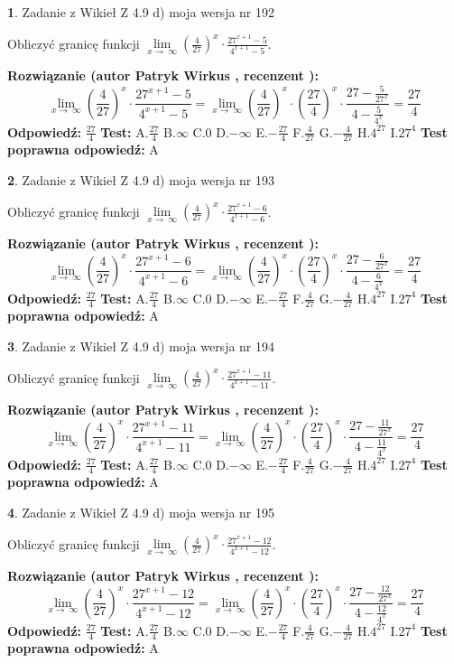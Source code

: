 \documentclass[12pt, a4paper]{article}
\theoremstyle{definition} %
\newtheorem{zad}{}
\newcommand{\zadStart}[1]{\begin{zad}#1\newline}
\newcommand{\zadStop}{\end{zad}}
\newcommand{\rozwStart}[2]{\noindent \textbf{Rozwiązanie (autor #1 , recenzent #2): }\newline}
\newcommand{\rozwStop}{\newline}
\newcommand{\odpStart}{\noindent \textbf{Odpowiedź:}\newline}
\newcommand{\odpStop}{\newline}
\newcommand{\testStart}{\noindent \textbf{Test:}\newline}
\newcommand{\testStop}{\newline}
\newcommand{\kluczStart}{\noindent \textbf{Test poprawna odpowiedź:}\newline}
\newcommand{\kluczStop}{\newline}
\begin{document}
\zadStart{Zadanie z Wikieł Z 4.9 d) moja wersja nr 192}


Obliczyć granicę funkcji  $\lim\limits_{x\to\ \infty}(\frac{4}{27})^{x}\cdot\frac{27^{x+1}-5}{4^{x+1}-5}$.
\zadStop
\rozwStart{Patryk Wirkus}{}
$$\lim\limits_{x\to\ \infty}(\frac{4}{27})^{x}\cdot\frac{27^{x+1}-5}{4^{x+1}-5}=\lim\limits_{x\to\ \infty}(\frac{4}{27})^{x}\cdot(\frac{27}{4})^{x} \cdot \frac{27-\frac{5}{27^{x}}}{4-\frac{5}{4^{x}}} = \frac{27}{4}$$
\rozwStop
\odpStart
$\frac{27}{4}$
\odpStop
\testStart
A.$\frac{27}{4}$ B.$\infty$ C.$0$ D.$-\infty$ E.$-\frac{27}{4}$
F.$\frac{4}{27}$ G.$-\frac{4}{27}$
H.$4^{27}$
I.$27^{4}$
\testStop
\kluczStart
A
\kluczStop



\zadStart{Zadanie z Wikieł Z 4.9 d) moja wersja nr 193}


Obliczyć granicę funkcji  $\lim\limits_{x\to\ \infty}(\frac{4}{27})^{x}\cdot\frac{27^{x+1}-6}{4^{x+1}-6}$.
\zadStop
\rozwStart{Patryk Wirkus}{}
$$\lim\limits_{x\to\ \infty}(\frac{4}{27})^{x}\cdot\frac{27^{x+1}-6}{4^{x+1}-6}=\lim\limits_{x\to\ \infty}(\frac{4}{27})^{x}\cdot(\frac{27}{4})^{x} \cdot \frac{27-\frac{6}{27^{x}}}{4-\frac{6}{4^{x}}} = \frac{27}{4}$$
\rozwStop
\odpStart
$\frac{27}{4}$
\odpStop
\testStart
A.$\frac{27}{4}$ B.$\infty$ C.$0$ D.$-\infty$ E.$-\frac{27}{4}$
F.$\frac{4}{27}$ G.$-\frac{4}{27}$
H.$4^{27}$
I.$27^{4}$
\testStop
\kluczStart
A
\kluczStop



\zadStart{Zadanie z Wikieł Z 4.9 d) moja wersja nr 194}


Obliczyć granicę funkcji  $\lim\limits_{x\to\ \infty}(\frac{4}{27})^{x}\cdot\frac{27^{x+1}-11}{4^{x+1}-11}$.
\zadStop
\rozwStart{Patryk Wirkus}{}
$$\lim\limits_{x\to\ \infty}(\frac{4}{27})^{x}\cdot\frac{27^{x+1}-11}{4^{x+1}-11}=\lim\limits_{x\to\ \infty}(\frac{4}{27})^{x}\cdot(\frac{27}{4})^{x} \cdot \frac{27-\frac{11}{27^{x}}}{4-\frac{11}{4^{x}}} = \frac{27}{4}$$
\rozwStop
\odpStart
$\frac{27}{4}$
\odpStop
\testStart
A.$\frac{27}{4}$ B.$\infty$ C.$0$ D.$-\infty$ E.$-\frac{27}{4}$
F.$\frac{4}{27}$ G.$-\frac{4}{27}$
H.$4^{27}$
I.$27^{4}$
\testStop
\kluczStart
A
\kluczStop



\zadStart{Zadanie z Wikieł Z 4.9 d) moja wersja nr 195}


Obliczyć granicę funkcji  $\lim\limits_{x\to\ \infty}(\frac{4}{27})^{x}\cdot\frac{27^{x+1}-12}{4^{x+1}-12}$.
\zadStop
\rozwStart{Patryk Wirkus}{}
$$\lim\limits_{x\to\ \infty}(\frac{4}{27})^{x}\cdot\frac{27^{x+1}-12}{4^{x+1}-12}=\lim\limits_{x\to\ \infty}(\frac{4}{27})^{x}\cdot(\frac{27}{4})^{x} \cdot \frac{27-\frac{12}{27^{x}}}{4-\frac{12}{4^{x}}} = \frac{27}{4}$$
\rozwStop
\odpStart
$\frac{27}{4}$
\odpStop
\testStart
A.$\frac{27}{4}$ B.$\infty$ C.$0$ D.$-\infty$ E.$-\frac{27}{4}$
F.$\frac{4}{27}$ G.$-\frac{4}{27}$
H.$4^{27}$
I.$27^{4}$
\testStop
\kluczStart
A
\kluczStop
\end{document}
